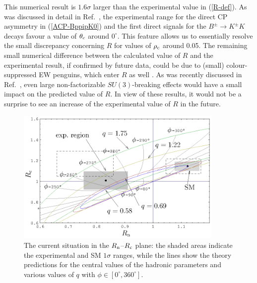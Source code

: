 \documentclass[12pt]{article}
\begin{document}
This numerical result is $1.6 \sigma$ larger than the experimental value
in (\ref{R-def}). As was discussed in detail in Ref.~\cite{BFRS-up}, 
the experimental range for the direct CP asymmetry in (\ref{ACP-BppipK0})  
and the first direct signals for the $B^\pm\to K^\pm K$ decays favour a 
value of $\theta_{\rm c}$ around $0^\circ$. This feature allows us to essentially 
resolve the small discrepancy concerning $R$ for values of $\rho_{\rm c}$ around 
0.05. The remaining small numerical difference between the calculated value of
$R$ and the experimental result, if confirmed by future data, could be due to
(small) colour-suppressed EW penguins, which enter $R$ as well \cite{BFRS3}.
As was recently discussed in Ref.~\cite{BFRS-5}, even large non-factorizable
$SU(3)$-breaking effects would have a small impact on the predicted value 
of $R$. In view of these results, it would not be a surprise to see an increase 
of the experimental value of $R$ in the future. 


\begin{figure}
\begin{center}
\includegraphics[width=10cm]{RnRc0511.eps}
\end{center}
\vspace*{-0.5truecm}
\caption{The current situation in the $R_{\rm n}$--$R_{\rm c}$ plane: the shaded 
areas indicate the experimental and SM $1 \sigma$ ranges, while the lines show the
theory predictions for the central values of the hadronic parameters
and various values of $q$ with $\phi\in[0^\circ,360^\circ]$.}\label{fig:RnRc}
\end{figure}
\end{document}
